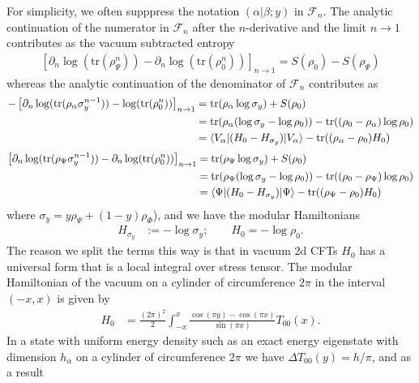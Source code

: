 \documentclass[11pt]{article}
\newcommand{\tr}{\mathrm{tr}}
\newcommand{\nn}{\nonumber}
\begin{document}
For simplicity, we often supppress the notation $(\alpha|\beta;y)$ in $\mathcal{F}_n$.
The analytic continuation of the numerator in $\mathcal{F}_n$ after the $n$-derivative and the limit $n\to 1$ contributes as the vacuum subtracted entropy
\begin{align}
  \left[\partial_n\log(\tr(\rho_\Psi^n))- \partial_n\log(\tr(\rho_0^n))\right]_{n\to 1}=S(\rho_0)-S(\rho_\Psi)
\end{align}
whereas the analytic continuation of the denominator of $\mathcal{F}_n$ contributes as 
\begin{align}
-\left[\partial_n\log(\tr(\rho_\alpha \sigma_y^{n-1}))-\log(\tr(\rho_0^n)) \right]_{n\to 1}&=\tr(\rho_\alpha\log\sigma_y)+S(\rho_0)\nn\\
&=\tr(\rho_\alpha(\log\sigma_y-\log \rho_0))-\tr((\rho_0-\rho_\alpha)\log\rho_0)\nn\\
&=\braket{V_\alpha|(H_0-H_{\sigma_y})|V_\alpha}-\tr((\rho_\alpha-\rho_0)H_0)
\end{align}
\begin{align}
\left[\partial_n\log(\tr(\rho_\Psi \sigma_y^{n-1}))-\partial_n\log(\tr(\rho_0^n)) \right]_{n\to 1}&=\tr(\rho_\Psi\log\sigma_y)+S(\rho_0)\nn\\
&=\tr(\rho_\Psi(\log\sigma_y-\log \rho_0))-\tr((\rho_0-\rho_\Psi)\log\rho_0)\nn\\
&=\braket{\Psi|(H_0-H_{\sigma_y})|\Psi}-\tr((\rho_\Psi-\rho_0)H_0)
\end{align}
where 
$\sigma_y=y\rho_\Psi+(1-y)\rho_\Phi$), and we have the modular Hamiltonians
\begin{align}
  H_{\sigma_y}&:=-\log\sigma_y; \qquad H_0=-\log\rho_0.
\end{align}
The reason we split the terms this way is that in vacuum 2d CFTs $H_0$ has a universal form that is a local integral over stress tensor. The modular Hamiltonian of the vacuum on a cylinder of circumference $2\pi$ in the interval $(-x,x)$ is given by
\begin{align}
H_0&=\frac{(2\pi)^2}{2}\int_{-x}^x\frac{\cos(\pi y)-\cos(\pi x)}{\sin(\pi x)}T_{00}(x).
\end{align}
In a state with uniform energy density such as an exact energy eigenstate with dimension $h_\alpha$ on a cylinder of circumference $2\pi$ we have $\Delta T_{00}(y)=h/\pi$, and as a result
\end{document}
